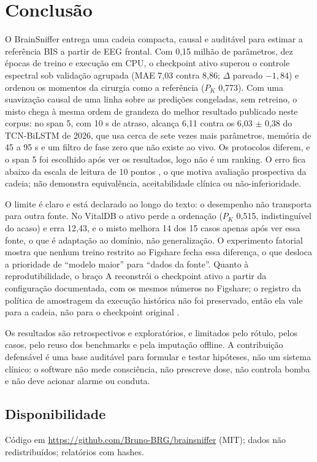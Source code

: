 \documentclass[12pt]{article}
\begin{document}
\section{Conclusão}

O BrainSniffer entrega uma cadeia compacta, causal e auditável para estimar a referência BIS a partir de EEG frontal. Com 0,15 milhão de parâmetros, dez épocas de treino e execução em CPU, o checkpoint ativo superou o controle espectral sob validação agrupada (MAE 7,03 contra 8,86; $\Delta$ pareado $-1{,}84$) e ordenou os momentos da cirurgia como a referência ($P_K$ 0,773). Com uma suavização causal de uma linha sobre as predições congeladas, sem retreino, o misto chega à mesma ordem de grandeza do melhor resultado publicado neste corpus: no span 5, com 10 s de atraso, alcança 6,11 contra os 6,03 $\pm$ 0,38 do TCN-BiLSTM de 2026, que usa cerca de sete vezes mais parâmetros, memória de 45 a 95 s e um filtro de fase zero que não existe ao vivo. Os protocolos diferem, e o span 5 foi escolhido após ver os resultados, logo não é um ranking. O erro fica abaixo da escala de leitura de 10 pontos \cite{harada2021}, o que motiva avaliação prospectiva da cadeia; não demonstra equivalência, aceitabilidade clínica ou não-inferioridade.

O limite é claro e está declarado ao longo do texto: o desempenho não transporta para outra fonte. No VitalDB o ativo perde a ordenação ($P_K$ 0,515, indistinguível do acaso) e erra 12,43, e o misto melhora 14 dos 15 casos apenas após ver essa fonte, o que é adaptação ao domínio, não generalização. O experimento fatorial mostra que nenhum treino restrito ao Figshare fecha essa diferença, o que desloca a prioridade de ``modelo maior'' para ``dados da fonte''. Quanto à reprodutibilidade, o braço A reconstrói o checkpoint ativo a partir da configuração documentada, com os mesmos números no Figshare; o registro da política de amostragem da execução histórica não foi preservado, então ela vale para a cadeia, não para o checkpoint original \cite{tripodai}.

Os resultados são retrospectivos e exploratórios, e limitados pelo rótulo, pelos casos, pelo reuso dos benchmarks e pela imputação offline. A contribuição defensável é uma base auditável para formular e testar hipóteses, não um sistema clínico: o software não mede consciência, não prescreve dose, não controla bomba e não deve acionar alarme ou conduta.

\subsection*{Disponibilidade}
Código em \url{https://github.com/Bruno-BRG/brainsniffer} (MIT); dados não redistribuídos; relatórios com hashes.

\begin{small}


\end{small}
\end{document}
